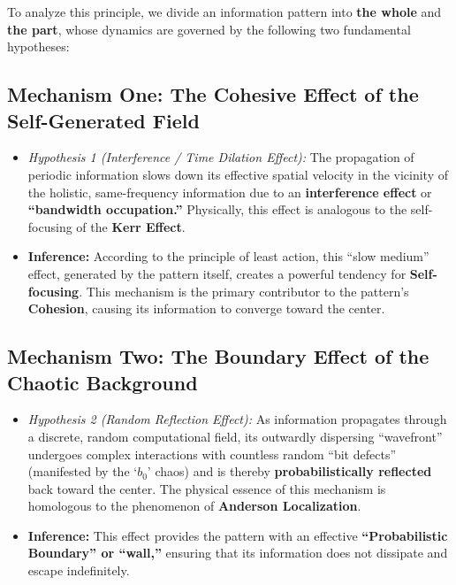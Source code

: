 \documentclass[11pt, a4paper]{article}
\begin{document}
To analyze this principle, we divide an information pattern into \textbf{the whole} and \textbf{the part}, whose dynamics are governed by the following two fundamental hypotheses:

\subsection{Mechanism One: The Cohesive Effect of the Self-Generated Field}

\begin{itemize}
    \item \textit{Hypothesis 1 (Interference / Time Dilation Effect):} The propagation of periodic information slows down its effective spatial velocity in the vicinity of the holistic, same-frequency information due to an \textbf{interference effect} or \textbf{“bandwidth occupation.”} Physically, this effect is analogous to the self-focusing of the \textbf{Kerr Effect}.
    
    \item \textbf{Inference:} According to the principle of least action, this ``slow medium'' effect, generated by the pattern itself, creates a powerful tendency for \textbf{Self-focusing}. This mechanism is the primary contributor to the pattern's \textbf{Cohesion}, causing its information to converge toward the center.
\end{itemize}

\subsection{Mechanism Two: The Boundary Effect of the Chaotic Background}

\begin{itemize}
    \item \textit{Hypothesis 2 (Random Reflection Effect):} As information propagates through a discrete, random computational field, its outwardly dispersing ``wavefront'' undergoes complex interactions with countless random ``bit defects'' (manifested by the `$b_0$' chaos) and is thereby \textbf{probabilistically reflected} back toward the center. The physical essence of this mechanism is homologous to the phenomenon of \textbf{Anderson Localization}.
    
    \item \textbf{Inference:} This effect provides the pattern with an effective \textbf{``Probabilistic Boundary'' or ``wall,''} ensuring that its information does not dissipate and escape indefinitely.
\end{itemize}
\end{document}
